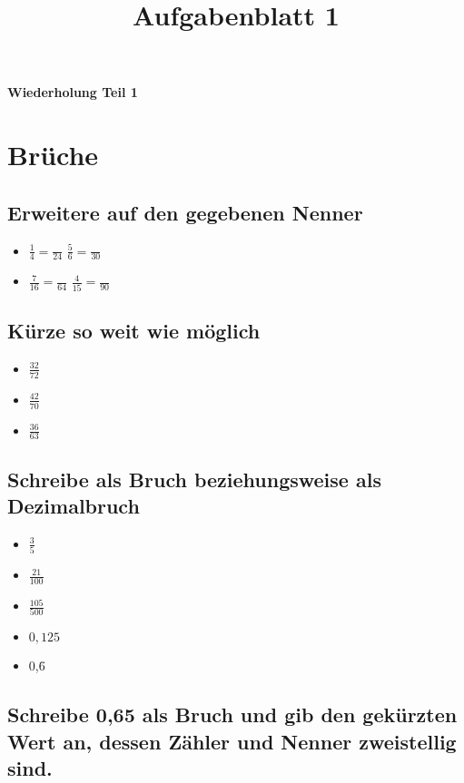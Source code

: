\documentclass[12pt, arial]{article}
\begin{document}
    \title{Aufgabenblatt 1}
        \begin{center}
            \textbf{ \Large  Wiederholung Teil 1}        
        \end{center}
        \section{Brüche}
        	\subsection{Erweitere auf den gegebenen Nenner}
                \begin{itemize}
                    \item[] $\frac{1}{4} = \frac{ }{24}$ \tabto{5cm} $\frac{5}{6} = \frac{ }{30}$ 
                    \item[] $\frac{7}{16} = \frac{ }{64}$ \tabto{5cm} $\frac{4}{15} = \frac{ }{90}$ 
                \end{itemize}
        	\subsection{Kürze so weit wie möglich}
                \begin{itemize}
                    \item[] $\frac{32}{72}$
                    \item[] $\frac{42}{70}$
                    \item[] $\frac{36}{63}$
                \end{itemize}
        	\subsection{Schreibe als Bruch beziehungsweise als Dezimalbruch}
                \begin{itemize}
                    \item[] $\frac{3}{5}$ 
                    \item[] $\frac{21}{100}$
                    \item[] $\frac{105}{500}$
                    \item[] $0,125$
                    \item[] 0,\={6}
                \end{itemize}
        	\subsection{Schreibe 0,65 als Bruch und gib den gekürzten Wert an, dessen Zähler und Nenner zweistellig sind.}
\end{document}
